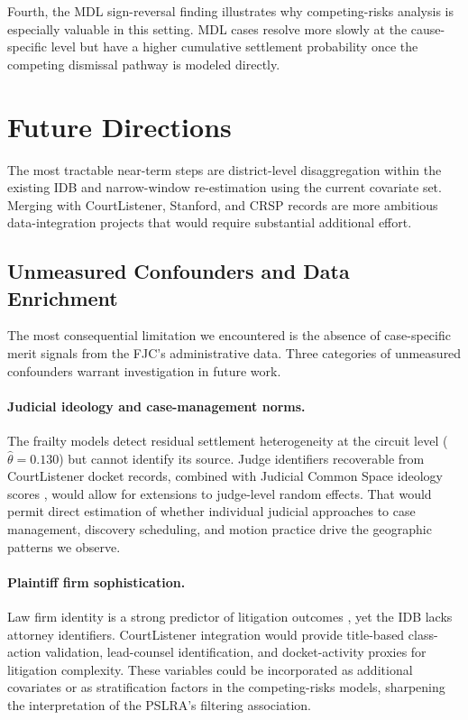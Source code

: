 Fourth, the MDL sign-reversal finding illustrates why
competing-risks analysis is especially valuable in this
setting. MDL cases resolve more slowly at the cause-specific
level but have a higher cumulative settlement probability once
the competing dismissal pathway is modeled directly.

\section{Future Directions}

The most tractable near-term steps are district-level
disaggregation within the existing IDB and narrow-window
re-estimation using the current covariate set. Merging with
CourtListener, Stanford, and CRSP records are more ambitious
data-integration projects that would require substantial
additional effort.

\subsection{Unmeasured Confounders and Data Enrichment}

The most consequential limitation we encountered is the
absence of case-specific merit signals from the FJC's
administrative data. Three categories of unmeasured
confounders warrant investigation in future work.

\paragraph{Judicial ideology and case-management norms.}
The frailty models detect residual settlement heterogeneity
at the circuit level ($\hat{\theta} = 0.130$) but cannot
identify its source. Judge identifiers recoverable from
CourtListener docket records, combined with Judicial Common
Space ideology scores \citep{epstein2007}, would allow for extensions to judge-level random effects. That would permit
direct estimation of whether individual judicial approaches
to case management, discovery scheduling, and motion practice
drive the geographic patterns we observe.

\paragraph{Plaintiff firm sophistication.}
Law firm identity is a strong predictor of litigation
outcomes \citep{wang2022}, yet the IDB lacks
attorney identifiers. CourtListener integration would
provide title-based class-action validation, lead-counsel
identification, and docket-activity proxies for litigation
complexity. These variables could be incorporated as
additional covariates or as stratification factors in the
competing-risks models, sharpening the interpretation of the
PSLRA's filtering association.

